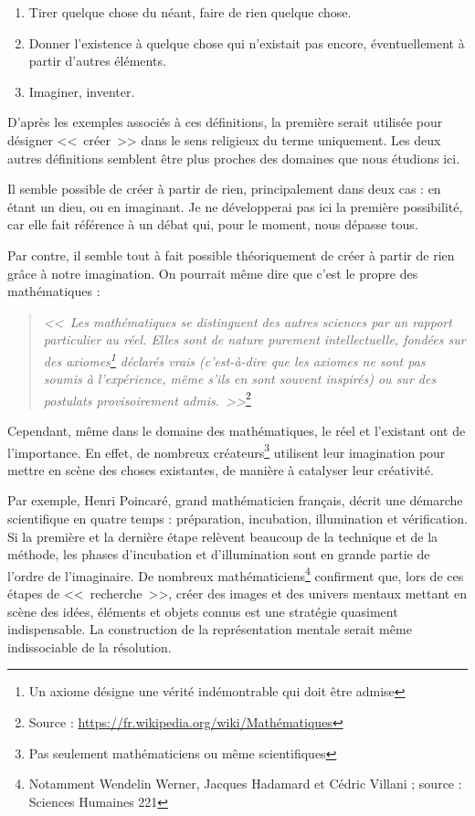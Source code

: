 \begin{enumerate}
\item Tirer quelque chose du néant, faire de rien quelque chose.
\item Donner l'existence à quelque chose qui n'existait pas encore, éventuellement à partir d'autres éléments.
\item Imaginer, inventer.
\end{enumerate}\bigskip

D'après les exemples associés à ces définitions, la première serait utilisée pour désigner <<~créer~>> dans le sens religieux du terme uniquement.
Les deux autres définitions semblent être plus proches des domaines que nous étudions ici.

Il semble possible de créer à partir de rien, principalement dans deux cas : en étant un dieu, ou en imaginant.
Je ne développerai pas ici la première possibilité, car elle fait référence à un débat qui, pour le moment, nous dépasse tous.

Par contre, il semble tout à fait possible théoriquement de créer à partir de rien grâce à notre imagination.
On pourrait même dire que c'est le propre des mathématiques :

\begin{quotation}
\textit{<<~Les mathématiques se distinguent des autres sciences par un rapport particulier au réel.
Elles sont de nature purement intellectuelle, fondées sur des axiomes\footnote{Un axiome désigne une vérité indémontrable qui doit être admise} déclarés vrais (c'est-à-dire que les axiomes ne sont pas soumis à l'expérience, même s'ils en sont souvent inspirés) ou sur des postulats provisoirement admis.~>>}\footnote{Source : \url{https://fr.wikipedia.org/wiki/Mathématiques}}
\end{quotation}

Cependant, même dans le domaine des mathématiques, le réel et l'existant ont de l'importance.
En effet, de nombreux créateurs\footnote{Pas seulement mathématiciens ou même scientifiques} utilisent leur imagination pour mettre en scène des choses existantes, de manière à catalyser leur créativité.

Par exemple, Henri Poincaré, grand mathématicien français, décrit une démarche scientifique en quatre temps : préparation, incubation, illumination et vérification.
Si la première et la dernière étape relèvent beaucoup de la technique et de la méthode, les phases d'incubation et d'illumination sont en grande partie de l'ordre de l'imaginaire.
De nombreux mathématiciens\footnote{Notamment Wendelin Werner, Jacques Hadamard et Cédric Villani ; source : Sciences Humaines \no{}221} confirment que, lors de ces étapes de <<~recherche~>>, créer des images et des univers mentaux mettant en scène des idées, éléments et objets connus est une stratégie quasiment indispensable. La construction de la représentation mentale serait même indissociable de la résolution.


